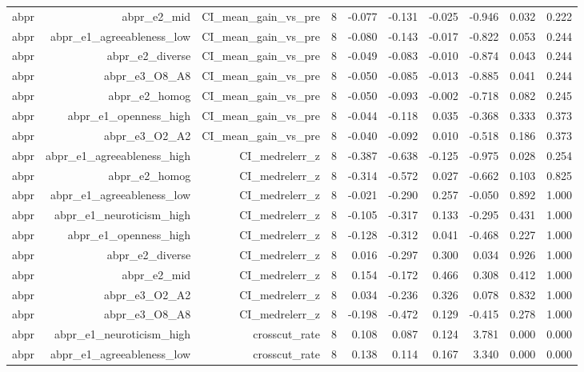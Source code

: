 \documentclass[11pt]{article}
\begin{document}
\begin{landscape}
\begin{longtable}{@{}lrrrrrrrrr@{}}
abpr & abpr\_e2\_mid & CI\_mean\_gain\_vs\_pre & 8 & -0.077 & -0.131 & -0.025 & -0.946 & 0.032 & 0.222 \\
abpr & abpr\_e1\_agreeableness\_low & CI\_mean\_gain\_vs\_pre & 8 & -0.080 & -0.143 & -0.017 & -0.822 & 0.053 & 0.244 \\
abpr & abpr\_e2\_diverse & CI\_mean\_gain\_vs\_pre & 8 & -0.049 & -0.083 & -0.010 & -0.874 & 0.043 & 0.244 \\
abpr & abpr\_e3\_O8\_A8 & CI\_mean\_gain\_vs\_pre & 8 & -0.050 & -0.085 & -0.013 & -0.885 & 0.041 & 0.244 \\
abpr & abpr\_e2\_homog & CI\_mean\_gain\_vs\_pre & 8 & -0.050 & -0.093 & -0.002 & -0.718 & 0.082 & 0.245 \\
abpr & abpr\_e1\_openness\_high & CI\_mean\_gain\_vs\_pre & 8 & -0.044 & -0.118 & 0.035 & -0.368 & 0.333 & 0.373 \\
abpr & abpr\_e3\_O2\_A2 & CI\_mean\_gain\_vs\_pre & 8 & -0.040 & -0.092 & 0.010 & -0.518 & 0.186 & 0.373 \\
abpr & abpr\_e1\_agreeableness\_high & CI\_medrelerr\_z & 8 & -0.387 & -0.638 & -0.125 & -0.975 & 0.028 & 0.254 \\
abpr & abpr\_e2\_homog & CI\_medrelerr\_z & 8 & -0.314 & -0.572 & 0.027 & -0.662 & 0.103 & 0.825 \\
abpr & abpr\_e1\_agreeableness\_low & CI\_medrelerr\_z & 8 & -0.021 & -0.290 & 0.257 & -0.050 & 0.892 & 1.000 \\
abpr & abpr\_e1\_neuroticism\_high & CI\_medrelerr\_z & 8 & -0.105 & -0.317 & 0.133 & -0.295 & 0.431 & 1.000 \\
abpr & abpr\_e1\_openness\_high & CI\_medrelerr\_z & 8 & -0.128 & -0.312 & 0.041 & -0.468 & 0.227 & 1.000 \\
abpr & abpr\_e2\_diverse & CI\_medrelerr\_z & 8 & 0.016 & -0.297 & 0.300 & 0.034 & 0.926 & 1.000 \\
abpr & abpr\_e2\_mid & CI\_medrelerr\_z & 8 & 0.154 & -0.172 & 0.466 & 0.308 & 0.412 & 1.000 \\
abpr & abpr\_e3\_O2\_A2 & CI\_medrelerr\_z & 8 & 0.034 & -0.236 & 0.326 & 0.078 & 0.832 & 1.000 \\
abpr & abpr\_e3\_O8\_A8 & CI\_medrelerr\_z & 8 & -0.198 & -0.472 & 0.129 & -0.415 & 0.278 & 1.000 \\
abpr & abpr\_e1\_neuroticism\_high & crosscut\_rate & 8 & 0.108 & 0.087 & 0.124 & 3.781 & 0.000 & 0.000 \\
abpr & abpr\_e1\_agreeableness\_low & crosscut\_rate & 8 & 0.138 & 0.114 & 0.167 & 3.340 & 0.000 & 0.000 \\

\end{longtable}
\end{landscape}
\end{document}
